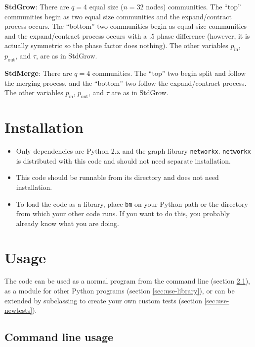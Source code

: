\documentclass{article}
\def\pin{p_\mathrm{in}}
\def\pout{p_\mathrm{out}}
\begin{document}
\textbf{StdGrow}: There are $q=4$ equal size ($n=32$ nodes)
communities.  The ``top'' communities begin as two equal size
communities and the expand/contract process occurs.  The ``bottom''
two communities begin as equal size communities and the
expand/contract process occurs with a .5 phase difference (however,
it is actually symmetric so the phase factor does nothing).  The other
variables $\pin$, $\pout$, and $\tau$, are as in StdGrow.

\textbf{StdMerge}: There are $q=4$ communities.  The ``top'' two begin
split and follow the merging process, and the ``bottom'' two follow
the expand/contract process.  The other variables $\pin$, $\pout$, and
$\tau$ are as in StdGrow.





\section{Installation}


\begin{itemize}
\item Only dependencies are Python 2.x and the graph library
  \texttt{networkx}.  \texttt{networkx} is distributed with this code
  and should not need separate installation.
\item This code should be runnable from its directory and does not
  need installation.
\item To load the code as a library, place \texttt{bm} on your Python
  path or the directory from which your other code runs.  If you want
  to do this, you probably already know what you are doing.
\end{itemize}





\section{Usage}

The code can be used as a normal program from the command line
(section \ref{sec:use-cli}), as a module for other Python programs
(section \ref{sec:use-library}), or can be extended by subclassing to
create your own custom tests (section \ref{sec:use-newtests}).




\subsection{Command line usage}
\label{sec:use-cli}
\end{document}
